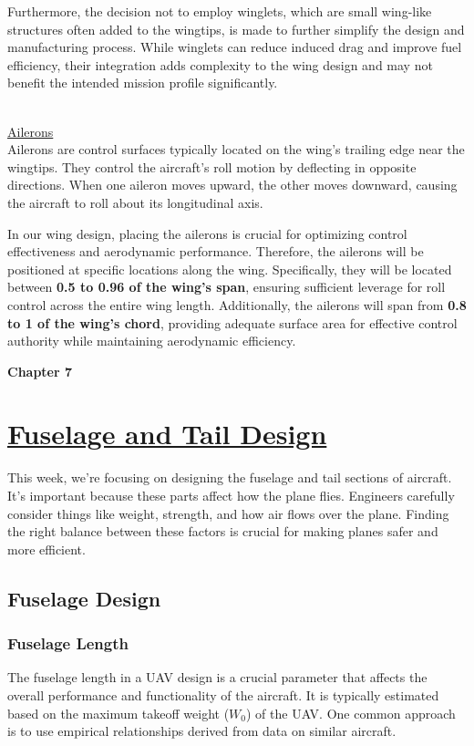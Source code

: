 \documentclass[12 pt]{article}
\begin{document}
{Furthermore, the decision not to employ winglets, which are small wing-like structures often added to the wingtips, is made to further simplify the design and manufacturing process. While winglets can reduce induced drag and improve fuel efficiency, their integration adds complexity to the wing design and may not benefit the intended mission profile significantly.\\
\\ \vspace{5mm}

\large{\underline{Ailerons}}\\
\color{black}
Ailerons are control surfaces typically located on the wing's trailing edge near the wingtips. They control the aircraft's roll motion by deflecting in opposite directions. When one aileron moves upward, the other moves downward, causing the aircraft to roll about its longitudinal axis.

In our wing design, placing the ailerons is crucial for optimizing control effectiveness and aerodynamic performance. Therefore, the ailerons will be positioned at specific locations along the wing. Specifically, they will be located between \textbf{0.5 to 0.96 of the wing's span}, ensuring sufficient leverage for roll control across the entire wing length. Additionally, the ailerons will span from \textbf{0.8 to 1 of the wing's chord}, providing adequate surface area for effective control authority while maintaining aerodynamic efficiency.

\newpage

\textbf{\Huge{Chapter 7}}
\section{\underline{Fuselage and Tail Design}}
This week, we're focusing on designing the fuselage and tail sections of aircraft. It's important because these parts affect how the plane flies. Engineers carefully consider things like weight, strength, and how air flows over the plane. Finding the right balance between these factors is crucial for making planes safer and more efficient.

\subsection{Fuselage Design}
\subsubsection{Fuselage Length}
\color{black}
{The fuselage length in a UAV design is a crucial parameter that affects the overall performance and functionality of the aircraft. It is typically estimated based on the maximum takeoff weight (\(W_0\)) of the UAV. One common approach is to use empirical relationships derived from data on similar aircraft.}

}
\end{document}
